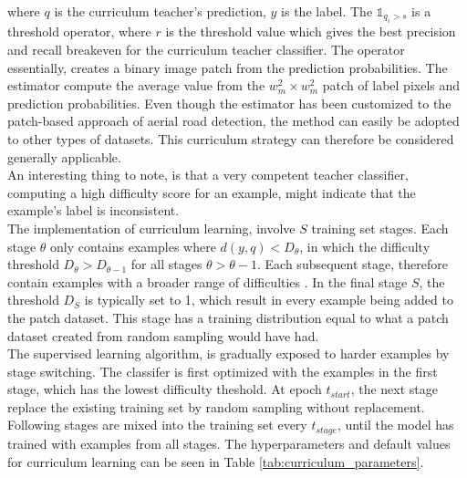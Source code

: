  
\noindent where $q$ is the curriculum teacher's prediction, $y$ is the label. The $\mathbb{1}_{q_i > s}$ is a threshold operator, where $r$ is the threshold value which gives the best precision and recall breakeven for the curriculum teacher classifier. The operator essentially, creates a binary image patch from the prediction probabilities. The estimator compute the average value from the $w_m^2 \times w_m^2$ patch of label pixels and prediction probabilities. Even though the estimator has been customized to the patch-based approach of aerial road detection, the method can easily be adopted to other types of datasets. This curriculum strategy can therefore be considered generally applicable.\\

An interesting thing to note, is that a very competent teacher classifier, computing a high difficulty score for an example, might indicate that the example's label is inconsistent.   \\

The implementation of curriculum learning, involve $S$ training set stages. Each stage $\theta$ only contains examples where $d(y, q) < D_{\theta}$, in which the difficulty threshold $ D_{\theta} > D_{\theta -1}$ for all stages $ \theta > \theta -1$. Each subsequent stage, therefore contain examples with a broader range of difficulties . In the final stage $S$, the threshold $D_{S}$ is typically set to 1, which result in every example being added to the patch dataset. This stage has a training distribution equal to what a patch dataset created from random sampling would have had.  \\

The supervised learning algorithm, is gradually exposed to harder examples by stage switching. The classifer is first optimized with the examples in the first stage, which has the lowest difficulty theshold. At epoch $t_{start}$, the next stage replace the existing training set by random sampling without replacement. Following stages are mixed into the training set every $t_{stage}$, until the model has trained with examples from all stages. The hyperparameters and default values for curriculum learning can be seen in Table \ref{tab:curriculum_parameters}. \\

